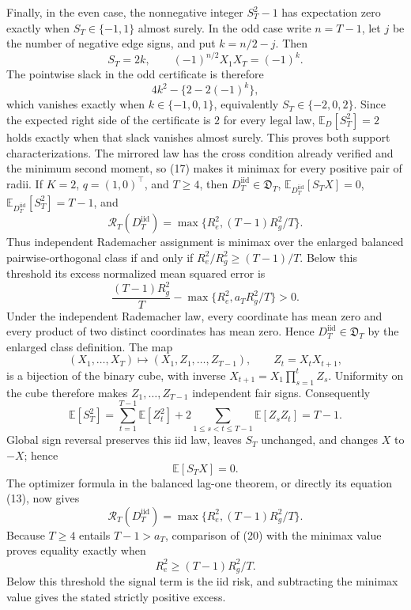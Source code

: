 Finally, in the even case, the nonnegative integer \(S_T^2-1\) has expectation zero exactly when \(S_T\in\{-1,1\}\) almost surely.  In the odd case write \(n=T-1\), let \(j\) be the number of negative edge signs, and put \(k=n/2-j\).  Then
\[
S_T=2k,
\qquad
(-1)^{n/2}X_1X_T=(-1)^k.
\]
The pointwise slack in the odd certificate is therefore
\[
4k^2-\{2-2(-1)^k\},
\]
which vanishes exactly when \(k\in\{-1,0,1\}\), equivalently \(S_T\in\{-2,0,2\}\).  Since the expected right side of the certificate is \(2\) for every legal law, \(\mathbb E_D[S_T^2]=2\) holds exactly when that slack vanishes almost surely.  This proves both support characterizations.  The mirrored law has the cross condition already verified and the minimum second moment, so (17) makes it minimax for every positive pair of radii.
If \(K=2\), \(q=(1,0)^{\top}\), and \(T\ge4\), then \(D_T^{\mathrm{iid}}\in\mathfrak D_T\), \(\mathbb E_{D_T^{\mathrm{iid}}}[S_TX]=0\), \(\mathbb E_{D_T^{\mathrm{iid}}}[S_T^2]=T-1\), and
\[
\mathcal R_T(D_T^{\mathrm{iid}})=\max\{R_e^2,(T-1)R_g^2/T\}.
\]
Thus independent Rademacher assignment is minimax over the enlarged balanced pairwise-orthogonal class if and only if \(R_e^2/R_g^2\ge(T-1)/T\).  Below this threshold its excess normalized mean squared error is
\[
\frac{(T-1)R_g^2}{T}-\max\{R_e^2,a_TR_g^2/T\}>0.
\]
Under the independent Rademacher law, every coordinate has mean zero and every product of two distinct coordinates has mean zero.  Hence \(D_T^{\mathrm{iid}}\in\mathfrak D_T\) by the enlarged class definition.  The map
\[
(X_1,\ldots,X_T)\longmapsto(X_1,Z_1,\ldots,Z_{T-1}),
\qquad Z_t=X_tX_{t+1},
\]
is a bijection of the binary cube, with inverse \(X_{t+1}=X_1\prod_{s=1}^{t}Z_s\).  Uniformity on the cube therefore makes \(Z_1,\ldots,Z_{T-1}\) independent fair signs.  Consequently
\[
\mathbb E[S_T^2]
=\sum_{t=1}^{T-1}\mathbb E[Z_t^2]
+2\sum_{1\le s<t\le T-1}\mathbb E[Z_sZ_t]
=T-1.
\tag{18}
\]
Global sign reversal preserves this iid law, leaves \(S_T\) unchanged, and changes \(X\) to \(-X\); hence
\[
\mathbb E[S_TX]=0.
\tag{19}
\]
The optimizer formula in the balanced lag-one theorem, or directly its equation (13), now gives
\[
\mathcal R_T(D_T^{\mathrm{iid}})
=\max\{R_e^2,(T-1)R_g^2/T\}.
\tag{20}
\]
Because \(T\ge4\) entails \(T-1>a_T\), comparison of (20) with the minimax value proves equality exactly when
\[
R_e^2\ge (T-1)R_g^2/T.
\]
Below this threshold the signal term is the iid risk, and subtracting the minimax value gives the stated strictly positive excess.
